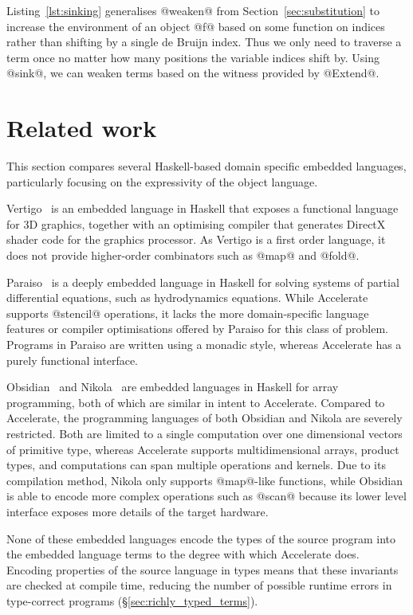 Listing~\ref{lst:sinking} generalises @weaken@ from
Section~\ref{sec:substitution} to increase the environment of an object @f@
based on some function on indices rather than shifting by a single de Bruijn
index. Thus we only need to traverse a term once no matter how many positions
the variable indices shift by. Using @sink@, we can weaken terms based on the
witness provided by @Extend@.


\section{Related work}

This section compares several Haskell-based domain specific embedded languages,
particularly focusing on the expressivity of the object language.
\lang[embedded]{}\lang[object]{}

Vertigo~\cite{Elliott:2004hh} is an embedded language in Haskell that exposes a
functional language for 3D graphics, together with an optimising compiler that
generates DirectX shader code for the graphics processor. As Vertigo is a first
order language, it does not provide higher-order combinators such as @map@ and
@fold@.

Paraiso~\cite{Muranushi:2012eh} is a deeply embedded language in Haskell for
solving systems of partial differential equations, such as hydrodynamics
equations. While Accelerate supports @stencil@ operations,
it lacks the more domain-specific language features or compiler optimisations
offered by Paraiso for this class of problem. Programs in Paraiso are written
using a monadic style, whereas Accelerate has a purely functional interface.

Obsidian~\cite{Svensson:2008a,Svensson:2013wd} and Nikola~\cite{Mainland:2010vj} are embedded
languages in Haskell for array programming, both of which are similar in intent
to Accelerate. Compared to Accelerate, the programming languages of both
Obsidian and Nikola are severely restricted. Both are limited to a single
computation over one dimensional vectors of primitive type, whereas Accelerate
supports multidimensional arrays, product types, and computations can span
multiple operations and kernels. Due to its compilation method, Nikola only
supports @map@-like functions, while Obsidian is able to encode more complex
operations such as @scan@ because its lower level interface exposes more details
of the target hardware.

None of these embedded languages encode the types of the source program into the
embedded language terms to the degree with which Accelerate does. Encoding
properties of the source language in types means that these invariants are
checked at compile time, %
reducing the number of possible runtime errors in type-correct programs
(\S\ref{sec:richly_typed_terms}).

